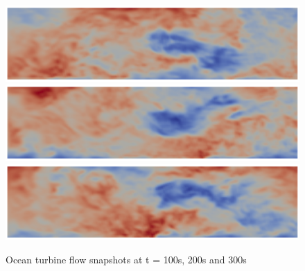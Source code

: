 \begin{figure}
\centering
\includegraphics[width=\textwidth]{images/ocean-side-profile1}
\includegraphics[width=\textwidth]{images/ocean-side-profile2}
\includegraphics[width=\textwidth]{images/ocean-side-profile3}
\caption{Ocean turbine flow snapshots at t = 100s, 200s and 300s}
\label{fig:ocean-side-profile1}
\end{figure}
